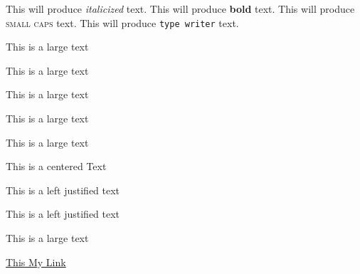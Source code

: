 \documentclass[11pt]{article}
\begin{document}

This will produce \textit{italicized} text.
This will produce \textbf{bold} text.
This will produce \textsc{small caps} text.
This will produce \texttt{type writer} text.
\begin{large}This is a large text\end{large}
\begin{Large}This is a large text\end{Large}
\begin{Huge}This is a large text\end{Huge}
\begin{small}This is a large text\end{small}
\begin{tiny}This is a large text\end{tiny}
\begin{center}This is a centered Text\end{center}
\begin{flushleft}This is a left justified text\end{flushleft}
\begin{flushright}This is a left justified text\end{flushright}

\Large
This is a large text


\href{www.google.com}{This My Link}

\end{document}
